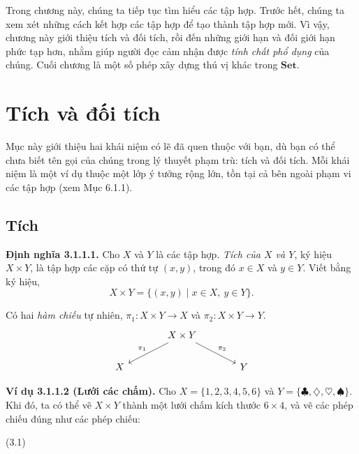 Trong chương này, chúng ta tiếp tục tìm hiểu các tập hợp. Trước hết, chúng ta xem xét những cách kết hợp các tập hợp để tạo thành tập hợp mới. Vì vậy, chương này giới thiệu tích và đối tích, rồi đến những giới hạn và đối giới hạn phức tạp hơn, nhằm giúp người đọc cảm nhận được \emph{tính chất phổ dụng} của chúng. Cuối chương là một số phép xây dựng thú vị khác trong $\mathbf{Set}$.

\section{Tích và đối tích}
Mục này giới thiệu hai khái niệm có lẽ đã quen thuộc với bạn, dù bạn có thể chưa biết tên gọi của chúng trong lý thuyết phạm trù: tích và đối tích. Mỗi khái niệm là một ví dụ thuộc một lớp ý tưởng rộng lớn, tồn tại cả bên ngoài phạm vi các tập hợp (xem Mục 6.1.1).

\subsection{Tích}
\noindent\textbf{Định nghĩa 3.1.1.1.} Cho $X$ và $Y$ là các tập hợp. \emph{Tích của $X$ và $Y$}, ký hiệu $X\times Y$, là tập hợp các cặp có thứ tự $(x,y)$, trong đó $x\in X$ và $y\in Y$. Viết bằng ký hiệu,
\[X\times Y=\{(x,y)\mid x\in X,\ y\in Y\}.\]

Có hai \emph{hàm chiếu} tự nhiên, $\pi_1:X\times Y\to X$ và $\pi_2:X\times Y\to Y$.
\[\begin{tikzcd}[column sep=large] & X\times Y\arrow[dl,"\pi_1"']\arrow[dr,"\pi_2"] &\\ X&&Y\end{tikzcd}\]

\noindent\textbf{Ví dụ 3.1.1.2 (Lưới các chấm).} Cho $X=\{1,2,3,4,5,6\}$ và $Y=\{\clubsuit,\diamondsuit,\heartsuit,\spadesuit\}$. Khi đó, ta có thể vẽ $X\times Y$ thành một lưới chấm kích thước $6\times4$, và vẽ các phép chiếu đúng như các phép chiếu:
\begin{center}\hfill(3.1)\end{center}

